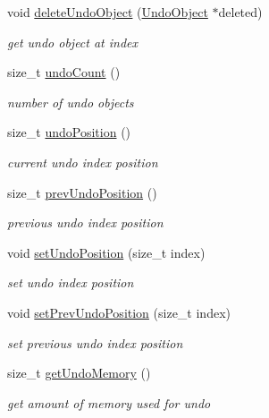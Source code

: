 \begin{DoxyCompactItemize}
void \hyperlink{classShipCAD_1_1ShipCADModel_a0c14ab36acacc74411446a65ffadaa06}{delete\-Undo\-Object} (\hyperlink{classShipCAD_1_1UndoObject}{Undo\-Object} $\ast$deleted)
\begin{DoxyCompactList}\small\item\em get undo object at index \end{DoxyCompactList}\item 
size\-\_\-t \hyperlink{classShipCAD_1_1ShipCADModel_a1d7ffa7d873dc1f43d21a62054ae356c}{undo\-Count} ()
\begin{DoxyCompactList}\small\item\em number of undo objects \end{DoxyCompactList}\item 
size\-\_\-t \hyperlink{classShipCAD_1_1ShipCADModel_a28d6c179e54a1e19997a0da2a38e4ca5}{undo\-Position} ()
\begin{DoxyCompactList}\small\item\em current undo index position \end{DoxyCompactList}\item 
size\-\_\-t \hyperlink{classShipCAD_1_1ShipCADModel_a5d2116df534ab1347961c6ab9748d1f1}{prev\-Undo\-Position} ()
\begin{DoxyCompactList}\small\item\em previous undo index position \end{DoxyCompactList}\item 
void \hyperlink{classShipCAD_1_1ShipCADModel_aa466832784532e736a1c2a16681a6d04}{set\-Undo\-Position} (size\-\_\-t index)
\begin{DoxyCompactList}\small\item\em set undo index position \end{DoxyCompactList}\item 
void \hyperlink{classShipCAD_1_1ShipCADModel_a27acd2ab4c6486a23db0b054962381bd}{set\-Prev\-Undo\-Position} (size\-\_\-t index)
\begin{DoxyCompactList}\small\item\em set previous undo index position \end{DoxyCompactList}\item 
size\-\_\-t \hyperlink{classShipCAD_1_1ShipCADModel_a0ab3edfdc89a6e297343d7c31b21658c}{get\-Undo\-Memory} ()
\begin{DoxyCompactList}\small\item\em get amount of memory used for undo \end{DoxyCompactList}\item 

\end{DoxyCompactItemize}
